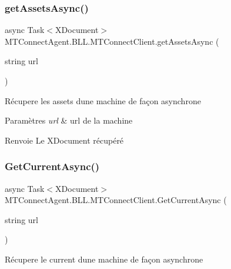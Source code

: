 \subsubsection{\texorpdfstring{get\+Assets\+Async()}{getAssetsAsync()}}
{\footnotesize\ttfamily async Task$<$X\+Document$>$ M\+T\+Connect\+Agent.\+B\+L\+L.\+M\+T\+Connect\+Client.\+get\+Assets\+Async (\begin{DoxyParamCaption}\item[{string}]{url }\end{DoxyParamCaption})\hspace{0.3cm}{\ttfamily [inline]}}



Récupere les assets d\textquotesingle{}une machine de façon asynchrone 


\begin{DoxyParams}{Paramètres}
{\em url} & url de la machine\\
\hline
\end{DoxyParams}
\begin{DoxyReturn}{Renvoie}
Le X\+Document récupéré
\end{DoxyReturn}
\mbox{\label{class_m_t_connect_agent_1_1_b_l_l_1_1_m_t_connect_client_a98f0238b0ad50cb531ff790c39e4b00d}} 
\subsubsection{\texorpdfstring{Get\+Current\+Async()}{GetCurrentAsync()}}
{\footnotesize\ttfamily async Task$<$X\+Document$>$ M\+T\+Connect\+Agent.\+B\+L\+L.\+M\+T\+Connect\+Client.\+Get\+Current\+Async (\begin{DoxyParamCaption}\item[{string}]{url }\end{DoxyParamCaption})\hspace{0.3cm}{\ttfamily [inline]}}



Récupere le current d\textquotesingle{}une machine de façon asynchrone 


